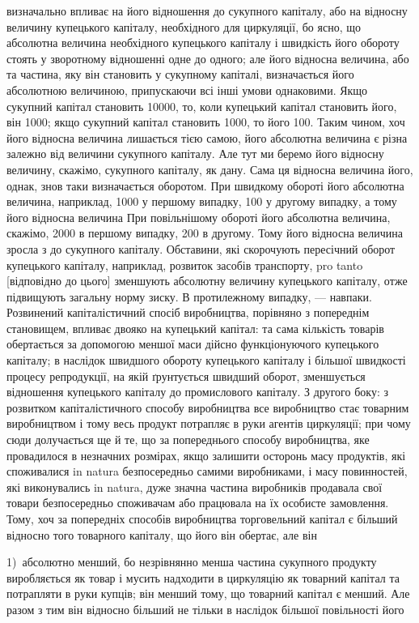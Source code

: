 \parcont{}  %
визначально впливає на його відношення до сукупного капіталу,
або на відносну величину купецького капіталу, необхідного для
циркуляції, бо ясно, що абсолютна величина необхідного купецького
капіталу і швидкість його обороту стоять у зворотному
відношенні одне до одного; але його відносна величина, або та
частина, яку він становить у сукупному капіталі, визначається
його абсолютною величиною, припускаючи всі інші умови
однаковими. Якщо сукупний капітал становить \num{10000}, то, коли
купецький капітал становить  його, він \deq{} 1000; якщо сукупний
капітал становить 1000, то   його \deq{} 100. Таким чином, хоч
його відносна величина лишається тією самою, його абсолютна
величина є різна залежно від величини сукупного капіталу. Але
тут ми беремо його відносну величину, скажімо,   сукупного капіталу,
як дану. Сама ця відносна величина його, однак, знов таки
визначається оборотом. При швидкому обороті його абсолютна величина,
наприклад, \deq{} 1000 у першому випадку,
\deq{} 100 у другому випадку, а тому його відносна величина \deq{} 
При повільнішому обороті його абсолютна величина, скажімо, \deq{}
2000 в першому випадку, \deq{} 200 в другому. Тому його відносна
величина зросла з   до  сукупного капіталу. Обставини,
які скорочують пересічний оборот купецького капіталу, наприклад,
розвиток засобів транспорту, pro tanto [відповідно до цього]
зменшують абсолютну величину купецького капіталу, отже
підвищують загальну норму зиску. В протилежному випадку, —
навпаки. Розвинений капіталістичний спосіб виробництва, порівняно
з попереднім становищем, впливає двояко на купецький
капітал: та сама кількість товарів обертається за допомогою
меншої маси дійсно функціонуючого купецького капіталу; в наслідок
швидшого обороту купецького капіталу і більшої швидкості
процесу репродукції, на якій ґрунтується швидший оборот,
зменшується відношення купецького капіталу до промислового
капіталу. З другого боку: з розвитком капіталістичного способу
виробництва все виробництво стає товарним виробництвом і тому
весь продукт потрапляє в руки агентів циркуляції; при чому
сюди долучається ще й те, що за попереднього способу виробництва,
яке провадилося в незначних розмірах, якщо залишити
осторонь масу продуктів, які споживалися in natura безпосередньо
самими виробниками, і масу повинностей, які виконувались
in natura, дуже значна частина виробників продавала свої
товари безпосередньо споживачам або працювала на їх особисте
замовлення. Тому, хоч за попередніх способів виробництва торговельний
капітал є більший відносно того товарного капіталу,
що його він обертає, але він

1)~абсолютно менший, бо незрівнянно менша частина сукупного
продукту виробляється як товар і мусить надходити в циркуляцію
як товарний капітал та потрапляти в руки купців; він менший
тому, що товарний капітал є менший. Але разом з тим він відносно
більший не тільки в наслідок більшої повільності його
\parbreak{}  %
